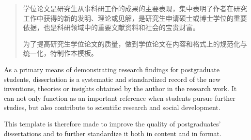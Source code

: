 
\begin{abstract}
	学位论文是研究生从事科研工作的成果的主要表现，集中表明了作者在研究工作中获得的新的发明、理论或见解，是研究生申请硕士或博士学位的重要依据，也是科研领域中的重要文献资料和社会的宝贵财富。
	
	为了提高研究生学位论文的质量，做到学位论文在内容和格式上的规范化与统一化，特制作本模板。
	
\end{abstract}

\begin{abstract*}
	As a primary means of demonstrating research findings for postgraduate students, dissertation is a systematic and standardized record of the new inventions, theories or insights obtained by the author in the research work. It can not only function as an important reference when students pursue further studies, but also contribute to scientific research and social development.
	
	This template is therefore made to improve the quality of postgraduates’ dissertations and to further standardize it both in content and in format.
	
\end{abstract*}
